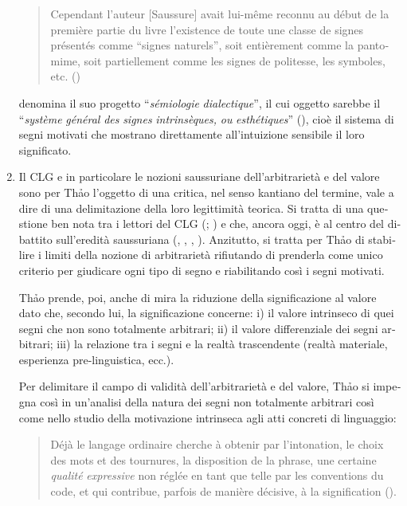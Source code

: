 \documentclass[italian,output=paper,colorlinks,citecolor=brown]{../langscibook}
\begin{document}
\begin{otherlanguage}{italian}
\begin{enumerate}
\begin{quote}
Cependant l’auteur [Saussure] avait lui-même reconnu au début de la première partie du livre l’existence de toute une classe de signes présentés comme “signes naturels”, soit entièrement comme la pantomime, soit partiellement comme les signes de politesse, les symboles, etc. (\citealt[39]{Thao1974})
\end{quote}

\citet[42]{Thao1974} denomina il suo progetto “\textit{sémiologie} \textit{dialectique}”, il cui oggetto sarebbe il “\textit{système} \textit{général} \textit{des} \textit{signes} \textit{intrinsèques,} \textit{ou} \textit{esthétiques}” (\citealt[40]{Thao1974}), cioè il sistema di segni motivati che mostrano direttamente all’intuizione sensibile il loro significato.

\item Il CLG e in particolare le nozioni saussuriane dell’arbitrarietà e del valore sono per Th\textlatin{ả}o l’oggetto di una critica, nel senso kantiano del termine, vale a dire di una delimitazione della loro legittimità teorica. Si tratta di una questione ben nota tra i lettori del CLG (\citealt[413--416]{De-Mauro2011}; \citealt{Sofia2013}) e che, ancora oggi, è al centro del dibattito sull’eredità saussuriana (\citealt{Rastier2002}, \citealt{Paolucci2012}, \citealt{Laks2012}, \citealt{Coursil2015}). Anzitutto, si tratta per Th\textlatin{ả}o di stabilire i limiti della nozione di arbitrarietà rifiutando di prenderla come unico criterio per giudicare ogni tipo di segno e riabilitando così i segni motivati.

Th\textlatin{ả}o prende, poi, anche di mira la riduzione della significazione al valore dato che, secondo lui, la significazione concerne: i) il valore intrinseco di quei segni che non sono totalmente arbitrari; ii) il valore differenziale dei segni arbitrari; iii) la relazione tra i segni e la realtà trascendente (realtà materiale, esperienza pre-linguistica, ecc.).

Per delimitare il campo di validità dell’arbitrarietà e del valore, Th\textlatin{ả}o si impegna così in un’analisi della natura dei segni non totalmente arbitrari così come nello studio della motivazione intrinseca agli atti concreti di linguaggio:

\begin{quote}
    Déjà le langage ordinaire cherche à obtenir par l’intonation, le choix des mots et des tournures, la disposition de la phrase, une certaine \textit{qualité} \textit{expressive} non réglée en tant que telle par les conventions du code, et qui contribue, parfois de manière décisive, à la signification (\citealt[39--40]{Thao1974}).
\end{quote}


\end{enumerate}
\end{otherlanguage}
\end{document}
